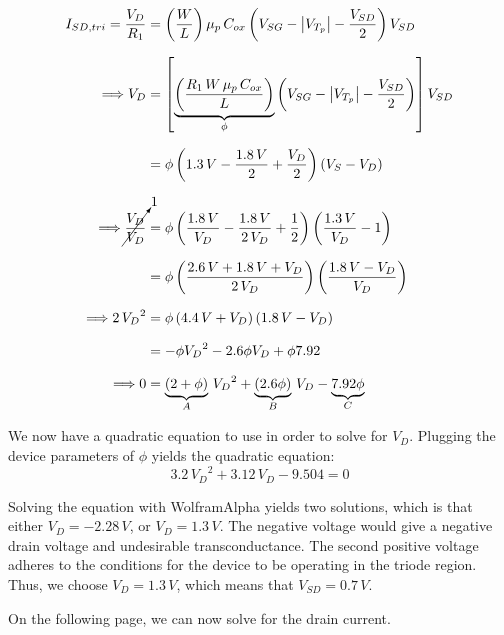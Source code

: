 \documentclass[12pt, fleqn]{article}
\begin{document}
\begin{enumerate}[label=(\alph*)]
{\begin{enumerate}[label=(\roman*)]
{        \begin{align*}
            I_{SD,tri} = \frac{V_D}{R_1}
            &=\left(\frac{W}{L}\right) \mu_p\,C_{ox}
                            \left(V_{SG} - \left|V_{T_p}\right| - \frac{V_{SD}}{2}\right) V_{SD}\\[0.25cm]
            \Longrightarrow V_D &= \left[\underbrace{\left(\frac{R_1\,W\,\mu_p\,C_{ox}}{L}\right)}_\phi \left(V_{SG} - \left|V_{T_p}\right| - \frac{V_{SD}}{2}\right)\right]  V_{SD}\\[0.25cm]
            &= \phi \left(1.3\,V - \frac{1.8\,V}{2} + \frac{V_D}{2}\right)\left(V_S - V_D\right)\\[0.25cm]
            \Longrightarrow \cancelto{1}{\frac{V_D}{V_D}} &= \phi \left(\frac{1.8\,V}{V_D} - \frac{1.8\,V}{2\,V_D} + \frac{1}{2}\right)\left(\frac{1.3\,V}{V_D} - 1\right)\\[0.25cm]
            &= \phi \left(\frac{2.6\,V + 1.8\,V + V_D}{2\,V_D}\right) \left(\frac{1.8\,V - V_D}{V_D}\right)\\[0.25cm]
            \Longrightarrow 2\,{V_D}^2 &= \phi \left(4.4\,V + V_D\right) \left(1.8\,V - V_D\right)\\[0.25cm]
            &= -\phi {V_D}^2 - 2.6\phi V_D + \phi7.92\\[0.25cm]
            \Longrightarrow 0 &= \underbrace{(2 + \phi)}_A\,{V_D}^2 + \underbrace{(2.6\phi)}_B\,V_D - \underbrace{7.92\phi}_C
        \end{align*}

        We now have a quadratic equation to use in order to solve for $V_D$.  Plugging the device parameters of $\phi$ yields the quadratic equation:
        \begin{equation}
            \boxed{3.2\,{V_D}^2 + 3.12\,V_D - 9.504 = 0}
        \end{equation}
        
        \vspace{0.25cm}
        Solving the equation with WolframAlpha yields two solutions, which is that either $V_D = -2.28\,V$, or $V_D = 1.3\,V$.  The negative voltage would give a negative drain voltage and undesirable transconductance.  The second positive voltage adheres to the conditions for the device to be operating in the triode region.  Thus, we choose $V_D = 1.3\,V$, which means that $V_{SD} = 0.7\,V$.
        
        \vspace{1cm}
        \noindent
        On the following page, we can now solve for the drain current.
        
}
\end{enumerate}}
\end{enumerate}
\end{document}
